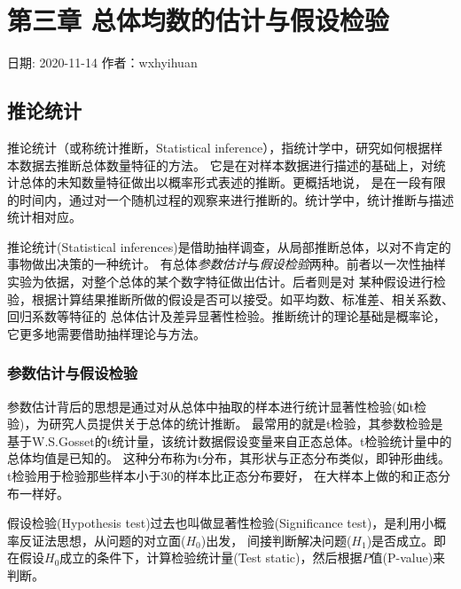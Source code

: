 \documentclass[
]{article}
\begin{document}
\hypertarget{ux7b2cux4e09ux7ae0-ux603bux4f53ux5747ux6570ux7684ux4f30ux8ba1ux4e0eux5047ux8bbeux68c0ux9a8c}{%
\section{第三章 总体均数的估计与假设检验}\label{ux7b2cux4e09ux7ae0-ux603bux4f53ux5747ux6570ux7684ux4f30ux8ba1ux4e0eux5047ux8bbeux68c0ux9a8c}}

日期: 2020-11-14
作者：wxhyihuan

\hypertarget{ux63a8ux8bbaux7edfux8ba1}{%
\subsection{推论统计}\label{ux63a8ux8bbaux7edfux8ba1}}

推论统计（或称统计推断，Statistical inference），指统计学中，研究如何根据样本数据去推断总体数量特征的方法。
它是在对样本数据进行描述的基础上，对统计总体的未知数量特征做出以概率形式表述的推断。更概括地说，
是在一段有限的时间内，通过对一个随机过程的观察来进行推断的。统计学中，统计推断与描述统计相对应。

推论统计(Statistical inferences)是借助抽样调查，从局部推断总体，以对不肯定的事物做出决策的一种统计。
有总体\emph{参数估计}与\emph{假设检验}两种。前者以一次性抽样实验为依据，对整个总体的某个数字特征做出估计。后者则是对
某种假设进行检验，根据计算结果推断所做的假设是否可以接受。如平均数、标准差、相关系数、回归系数等特征的
总体估计及差异显著性检验。推断统计的理论基础是概率论，它更多地需要借助抽样理论与方法。

\hypertarget{ux53c2ux6570ux4f30ux8ba1ux4e0eux5047ux8bbeux68c0ux9a8c}{%
\subsubsection{参数估计与假设检验}\label{ux53c2ux6570ux4f30ux8ba1ux4e0eux5047ux8bbeux68c0ux9a8c}}

参数估计背后的思想是通过对从总体中抽取的样本进行统计显著性检验(如t检验)，为研究人员提供关于总体的统计推断。
最常用的就是t检验，其参数检验是基于W.S.Gosset的t统计量，该统计数据假设变量来自正态总体。t检验统计量中的总体均值是已知的。
这种分布称为t分布，其形状与正态分布类似，即钟形曲线。t检验用于检验那些样本小于30的样本比正态分布要好，
在大样本上做的和正态分布一样好。

假设检验(Hypothesis test)过去也叫做显著性检验(Significance test)，是利用小概率反证法思想，从问题的对立面(\(H_0\))出发，
间接判断解决问题(\(H_1\))是否成立。即在假设\(H_0\)成立的条件下，计算检验统计量(Test static)，然后根据\(P\)值(P-value)来判断。
\end{document}
